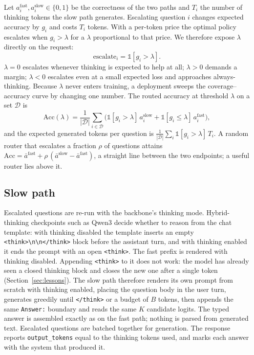 \documentclass{article}
\newcommand{\fast}{\mathrm{fast}}
\newcommand{\slow}{\mathrm{slow}}
\newcommand{\gain}{g}
\begin{document}
Let $a_i^{\fast},a_i^{\slow}\in\{0,1\}$ be the correctness of the two paths and $T_i$ the number of thinking tokens the slow path generates. Escalating question $i$ changes expected accuracy by $\gain_i$ and costs $T_i$ tokens. With a per-token price the optimal policy escalates when $\gain_i>\lambda$ for a $\lambda$ proportional to that price. We therefore expose $\lambda$ directly on the request:
\begin{equation}
  \text{escalate}_i=\mathbb{1}[\gain_i>\lambda].
\end{equation}
$\lambda=0$ escalates whenever thinking is expected to help at all; $\lambda>0$ demands a margin; $\lambda<0$ escalates even at a small expected loss and approaches always-thinking. Because $\lambda$ never enters training, a deployment sweeps the coverage--accuracy curve by changing one number. The routed accuracy at threshold $\lambda$ on a set $\mathcal{D}$ is
\begin{equation}
  \mathrm{Acc}(\lambda)=\frac{1}{|\mathcal{D}|}\sum_{i\in\mathcal{D}}\Big(\mathbb{1}[\gain_i>\lambda]\,a_i^{\slow}+\mathbb{1}[\gain_i\le\lambda]\,a_i^{\fast}\Big),
\end{equation}
and the expected generated tokens per question is $\frac{1}{|\mathcal{D}|}\sum_i\mathbb{1}[\gain_i>\lambda]\,T_i$. A random router that escalates a fraction $\rho$ of questions attains $\mathrm{Acc}=\bar a^{\fast}+\rho\,(\bar a^{\slow}-\bar a^{\fast})$, a straight line between the two endpoints; a useful router lies above it.

\subsection{Slow path}
\label{sec:slow}

Escalated questions are re-run with the backbone's thinking mode. Hybrid-thinking checkpoints such as Qwen3 \citep{yang2025qwen3} decide whether to reason from the chat template: with thinking disabled the template inserts an empty \texttt{<think>\textbackslash n\textbackslash n</think>} block before the assistant turn, and with thinking enabled it ends the prompt with an open \texttt{<think>}. The fast prefix is rendered with thinking disabled. Appending \texttt{<think>} to it does not work: the model has already seen a closed thinking block and closes the new one after a single token (Section~\ref{sec:lessons}). The slow path therefore renders its own prompt from scratch with thinking enabled, placing the question body in the user turn, generates greedily until \texttt{</think>} or a budget of $B$ tokens, then appends the same \texttt{Answer:} boundary and reads the same $K$ candidate logits. The typed answer is assembled exactly as on the fast path; nothing is parsed from generated text. Escalated questions are batched together for generation. The response reports \texttt{output\_tokens} equal to the thinking tokens used, and marks each answer with the system that produced it.
\end{document}
